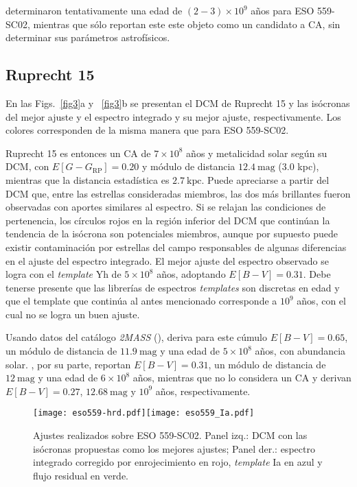 \documentclass[baaa]{baaa}
\begin{document}
\cite{O18} determinaron tentativamente una edad de $(2 - 3) \times 10^9$ a\~nos para ESO 559-SC02, mientras que \cite{B19} s\'olo reportan este este objeto como un candidato a CA, sin determinar sus par\'ametros astrof\'isicos.

\subsection{Ruprecht 15}
En las Figs.~\ref{fig3}a y ~\ref{fig3}b se presentan el DCM de Ruprecht 15 y las is\'ocronas del mejor ajuste y el espectro integrado y su mejor ajuste, respectivamente. Los colores corresponden de la misma manera que para ESO 559-SC02.

Ruprecht 15 es entonces un CA de $7 \times 10^8$ a\~nos y metalicidad solar seg\'un su DCM, con $E[G - G_\textrm{RP}] = 0.20$ y m\'odulo de distancia $12.4~\mathrm{mag}$ (3.0 kpc), mientras que la distancia estad\'istica es $2.7~\mathrm{kpc}$. Puede apreciarse a partir del DCM que, entre las estrellas consideradas miembros, las dos m\'as brillantes fueron observadas con aportes similares al espectro. Si se relajan las condiciones de pertenencia, los c\'irculos rojos en la regi\'on inferior del DCM que contin\'uan la tendencia de la is\'ocrona son potenciales miembros, aunque por supuesto puede existir contaminaci\'on por estrellas del campo responsables de algunas diferencias en el ajuste del espectro integrado. El mejor ajuste del espectro observado se logra con el {\em template} Yh de $5 \times 10^8$ a\~nos, adoptando $E[B - V] = 0.31$. Debe tenerse presente que las librer\'ias de espectros {\em templates} son discretas en edad y que el template que contin\'ua al antes mencionado corresponde a $10^9$ a\~nos, con el cual no se logra un buen ajuste.

Usando datos del cat\'alogo {\sl 2MASS} (\citealt{S06}), \cite{T12} deriva para este c\'umulo $E[B - V] = 0.65$, un m\'odulo de distancia de $11.9~\mathrm{mag}$ y una edad de $5 \times 10^8$ a\~nos, con abundancia solar. \cite{K13}, por su parte, reportan $E[B - V] = 0.31$, un m\'odulo de distancia de $12~\mathrm{mag}$ y una edad de $6 \times 10^8$ a\~nos, mientras que \cite{P17} no lo considera un CA y \cite{L17} derivan $E[B - V] = 0.27$, $12.68~\mathrm{mag}$ y $10^9$ a\~nos, respectivamente.

\begin{figure}
    \centering
    \texttt{[image: eso559-hrd.pdf]}\texttt{[image: eso559\_Ia.pdf]}
    \caption{Ajustes realizados sobre ESO 559-SC02. Panel izq.: DCM con las is\'ocronas propuestas como los mejores ajustes; Panel der.: espectro integrado corregido por enrojecimiento en rojo, {\em template} Ia en azul y flujo residual en verde.}
    \label{fig2}
\end{figure}
\end{document}
